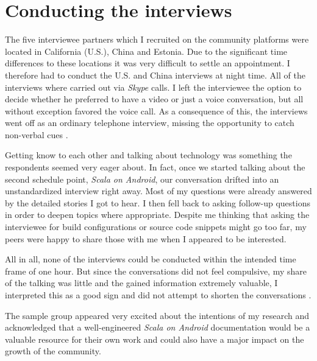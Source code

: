 \section{Conducting the interviews}

The five interviewee partners which I recruited on the community platforms were located in California (U.S.), China and Estonia. Due to the significant time differences to these locations it was very difficult to settle an appointment. I therefore had to conduct the U.S. and China interviews at night time. All of the interviews where carried out via \textit{Skype} calls. I left the interviewee the option to decide whether he preferred to have a video or just a voice conversation, but all without exception favored the voice call. As a consequence of this, the interviews went off as an ordinary telephone interview, missing the opportunity to catch non-verbal cues \cite[p. 82]{berg01}.

Getting know to each other and talking about technology was something the respondents seemed very eager about. In fact, once we started talking about the second schedule point, \textit{Scala on Android}, our conversation drifted into an unstandardized interview right away. Most of my questions were already answered by the detailed stories I got to hear. I then fell back to asking follow-up questions in order to deepen topics where appropriate. Despite me thinking that asking the interviewee for build configurations or source code snippets might go too far, my peers were happy to share those with me when I appeared to be interested.

All in all, none of the interviews could be conducted within the intended time frame of one hour. But since the conversations did not feel compulsive, my share of the talking was little and the gained information extremely valuable, I interpreted this as a good sign and did not attempt to shorten the conversations \cite[p. 81]{berg01}.

The sample group appeared very excited about the intentions of my research and acknowledged that a well-engineered \textit{Scala on Android} documentation would be a valuable resource for their own work and could also have a major impact on the growth of the community.